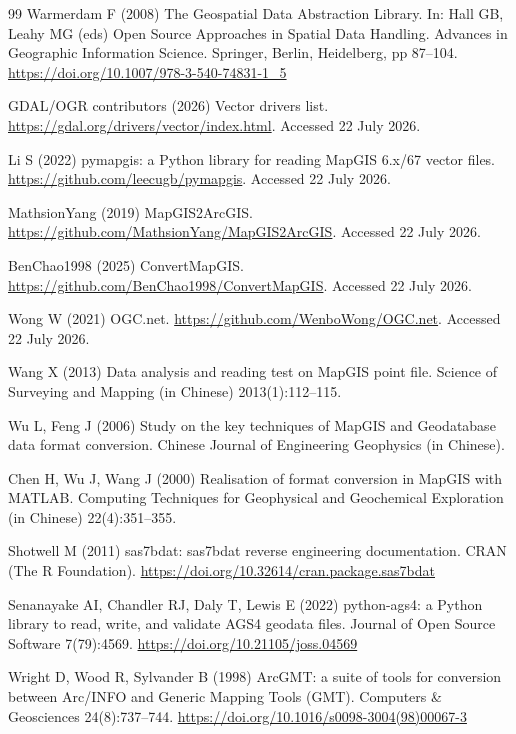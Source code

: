 \documentclass[11pt,a4paper]{article}
\begin{document}
\begin{thebibliography}{99}
Warmerdam F (2008) The Geospatial Data Abstraction Library. In: Hall GB, Leahy MG (eds) Open Source Approaches in Spatial Data Handling. Advances in Geographic Information Science. Springer, Berlin, Heidelberg, pp 87--104. \url{https://doi.org/10.1007/978-3-540-74831-1_5}

GDAL/OGR contributors (2026) Vector drivers list. \url{https://gdal.org/drivers/vector/index.html}. Accessed 22 July 2026.

Li S (2022) pymapgis: a Python library for reading MapGIS 6.x/67 vector files. \url{https://github.com/leecugb/pymapgis}. Accessed 22 July 2026.

MathsionYang (2019) MapGIS2ArcGIS. \url{https://github.com/MathsionYang/MapGIS2ArcGIS}. Accessed 22 July 2026.

BenChao1998 (2025) ConvertMapGIS. \url{https://github.com/BenChao1998/ConvertMapGIS}. Accessed 22 July 2026.

Wong W (2021) OGC.net. \url{https://github.com/WenboWong/OGC.net}. Accessed 22 July 2026.

Wang X (2013) Data analysis and reading test on MapGIS point file. Science of Surveying and Mapping (in Chinese) 2013(1):112--115.

Wu L, Feng J (2006) Study on the key techniques of MapGIS and Geodatabase data format conversion. Chinese Journal of Engineering Geophysics (in Chinese).

Chen H, Wu J, Wang J (2000) Realisation of format conversion in MapGIS with MATLAB. Computing Techniques for Geophysical and Geochemical Exploration (in Chinese) 22(4):351--355.

Shotwell M (2011) sas7bdat: sas7bdat reverse engineering documentation. CRAN (The R Foundation). \url{https://doi.org/10.32614/cran.package.sas7bdat}

Senanayake AI, Chandler RJ, Daly T, Lewis E (2022) python-ags4: a Python library to read, write, and validate AGS4 geodata files. Journal of Open Source Software 7(79):4569. \url{https://doi.org/10.21105/joss.04569}

Wright D, Wood R, Sylvander B (1998) ArcGMT: a suite of tools for conversion between Arc/INFO and Generic Mapping Tools (GMT). Computers \& Geosciences 24(8):737--744. \url{https://doi.org/10.1016/s0098-3004(98)00067-3}


\end{thebibliography}
\end{document}
